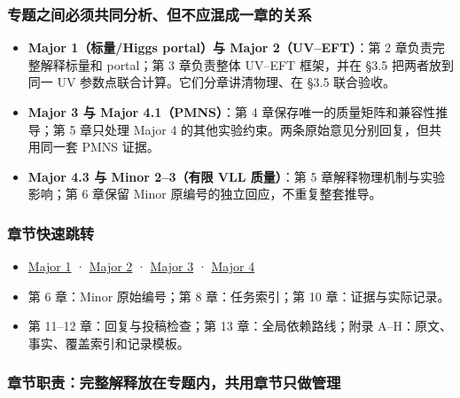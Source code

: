 \documentclass[
]{article}
\providecommand{\tightlist}{%
  \setlength{\itemsep}{0pt}\setlength{\parskip}{0pt}}
\begin{document}
\subsubsection{专题之间必须共同分析、但不应混成一章的关系}\label{ux4e13ux9898ux4e4bux95f4ux5fc5ux987bux5171ux540cux5206ux6790ux4f46ux4e0dux5e94ux6df7ux6210ux4e00ux7ae0ux7684ux5173ux7cfb}

\begin{itemize}
\tightlist
\item
  \textbf{Major 1（标量/Higgs portal）与 Major 2（UV--EFT）}：第 2
  章负责完整解释标量和 portal；第 3 章负责整体 UV--EFT 框架，并在 §3.5
  把两者放到同一 UV 参数点联合计算。它们分章讲清物理、在 §3.5 联合验收。
\item
  \textbf{Major 3 与 Major 4.1（PMNS）}：第 4
  章保存唯一的质量矩阵和兼容性推导；第 5 章只处理 Major 4
  的其他实验约束。两条原始意见分别回复，但共用同一套 PMNS 证据。
\item
  \textbf{Major 4.3 与 Minor 2--3（有限 VLL 质量）}：第 5
  章解释物理机制与实验影响；第 6 章保留 Minor
  原编号的独立回应，不重复整套推导。
\end{itemize}

\subsubsection{章节快速跳转}\label{ux7ae0ux8282ux5febux901fux8df3ux8f6c}

\begin{itemize}
\tightlist
\item
  \hyperref[major-1]{Major 1} · \hyperref[major-2]{Major 2} ·
  \hyperref[major-3]{Major 3} · \hyperref[major-4]{Major 4}
\item
  第 6 章：Minor 原始编号；第 8 章：任务索引；第 10 章：证据与实际记录。
\item
  第 11--12 章：回复与投稿检查；第 13 章：全局依赖路线；附录
  A--H：原文、事实、覆盖索引和记录模板。
\end{itemize}

\subsubsection{章节职责：完整解释放在专题内，共用章节只做管理}\label{ux7ae0ux8282ux804cux8d23ux5b8cux6574ux89e3ux91caux653eux5728ux4e13ux9898ux5185ux5171ux7528ux7ae0ux8282ux53eaux505aux7ba1ux7406}
\end{document}
